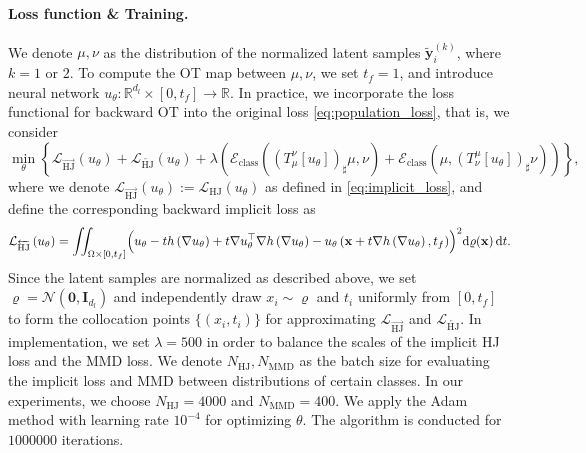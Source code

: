 \documentclass{article} %
\theoremstyle{plain}
\theoremstyle{definition}
\theoremstyle{remark}
\newcommand{\bx}{\mathbf{x}}
\newcommand{\LHJ}{\mathcal{L}_{\text{HJ}}}
\newcommand{\LHJf}{\mathcal{L}_{\overrightarrow{\text{HJ}}}}
\newcommand{\LHJb}{\mathcal{L}_{\overleftarrow{\text{HJ}}}}
\newcommand{\rd}{\mathrm{d}}
\newcommand{\tp}{^{\top}}
\begin{document}
\paragraph{Loss function \& Training.} 
We denote $\mu, \nu$ as the distribution of the normalized latent samples $\widetilde{\textbf{y}}_i^{(k)}$, where $k=1$ or $2$. To compute the OT map between $\mu, \nu$, we set $t_f=1$, and introduce neural network $u_\theta:\mathbb{R}^{d_l}\times[0, t_f]\rightarrow\mathbb{R}$. In practice, we incorporate the loss functional for backward OT into the original loss \eqref{eq:population_loss}, that is, we consider
\begin{equation*}
  \min_{\theta} \left\{\LHJf(u_\theta) + \LHJb(u_\theta) + \lambda( \mathcal{E}_{\text{class}}(\left(T_\mu^\nu\left[u_\theta\right]\right)_\sharp\mu, \nu) + \mathcal{E}_{\text{class}}(\mu, \left(T_\nu^\mu\left[u_\theta\right]\right)_\sharp\nu))\right\},
\end{equation*}
where we denote $\LHJf(u_\theta):=\LHJ(u_\theta)$ as defined in \eqref{eq:implicit_loss}, and define the corresponding backward implicit loss as
\begin{equation*}
    \LHJb\left(u_\theta\right)=\iint_{\Omega \times [0, t_f]} \Bigl(u_\theta - th\left(\nabla u_\theta\right) + t\nabla u_\theta\tp\nabla h\left(\nabla u_\theta\right) - u_\theta\left(\bx+t\nabla h\left(\nabla u_\theta\right), t_f\right)\Bigr)^2 \rd\varrho(\bx) \,\rd t.
\end{equation*}
Since the latent samples are normalized as described above, we set \(\varrho = \mathcal{N}(\mathbf{0}, \mathbf{I}_{d_l})\) and independently draw \(x_i \sim \varrho\) and \(t_i\) uniformly from \([0, t_f]\) to form the collocation points \(\{(x_i, t_i)\}\) for approximating $\LHJf$ and $\LHJb$. In implementation, we set $\lambda = 500$ in order to balance the scales of the implicit HJ loss and the MMD loss. We denote $N_{\text{HJ}}, N_{\text{MMD}}$ as the batch size for evaluating the implicit loss and MMD between distributions of certain classes. In our experiments, we choose $N_{\text{HJ}}=4000$ and $N_{\text{MMD}}=400$. We apply the Adam method with learning rate $10^{-4}$ for optimizing $\theta$. The algorithm is conducted for $1000000$ iterations.
\end{document}
